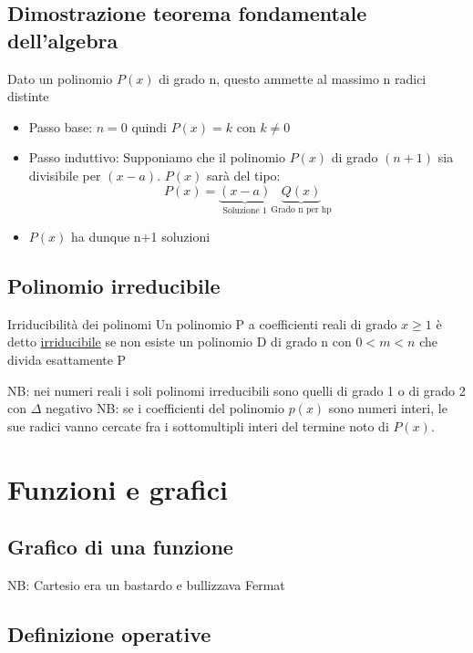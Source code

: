 \subsection{Dimostrazione teorema fondamentale dell'algebra}
\label{sub:dimostrazioneperinduzione}
Dato un polinomio $P\left( x \right) $ di grado n, questo ammette al massimo n radici distinte
\begin{itemize}
	\item Passo base: $n=0$ quindi  $P\left( x \right) = k$ con $k \neq 0$
	\item Passo induttivo: Supponiamo che il polinomio $P\left( x \right) $ di grado $\left( n+1 \right)$ sia divisibile per $\left( x-a \right) $. $P\left( x \right)$ sarà del tipo: \[
		      P\left( x \right) = \underbrace{\left( x-a \right) }_{\text{Soluzione 1}}\underbrace{Q\left( x \right)}_{\text{Grado n per hp}}
	      \]
	\item $P\left( x \right) $ ha dunque n+1 soluzioni
\end{itemize}
\subsection{Polinomio irreducibile}

\begin{teorema}{Irriducibilità dei polinomi}
	Un polinomio P a coefficienti reali di grado $x \ge 1$ è detto \underline{irriducibile} se non esiste un polinomio D di grado n con $0 < m < n$ che divida esattamente P
\end{teorema}

NB: nei numeri reali i soli polinomi irreducibili sono quelli di grado 1 o di grado 2 con $\Delta$ negativo
\vskip3mm
NB: se i coefficienti del polinomio $ p\left( x \right) $ sono numeri interi, le sue radici vanno cercate fra i sottomultipli interi del termine noto di $P\left( x \right)$.
\section{Funzioni e grafici}
\subsection{Grafico di una funzione}

NB: Cartesio era un bastardo e bullizzava Fermat
\subsection{Definizione operative}

